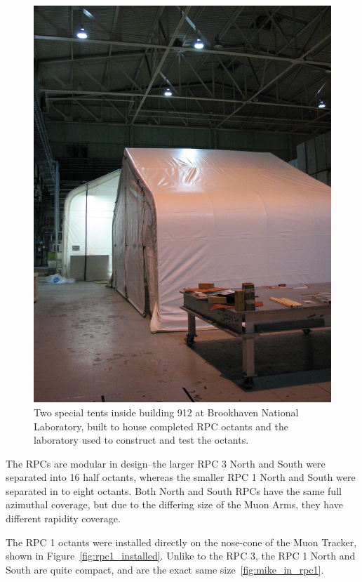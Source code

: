 \begin{figure}
  \centering
  \includegraphics[width=0.5\linewidth]{./figures/building_912_rpc_tent.jpg}
  \caption{
    Two special tents inside building 912 at Brookhaven National Laboratory,
    built to house completed RPC octants and the laboratory used to construct
    and test the octants. 
  }
  \label{fig:building_912}
\end{figure}

The RPCs are modular in design--the larger RPC 3 North and South were separated
into 16 half octants, whereas the smaller RPC 1 North and South were separated
in to eight octants. Both North and South RPCs have the same full azimuthal
coverage, but due to the differing size of the Muon Arms, they have different
rapidity coverage.

The RPC 1 octants were installed directly on the nose-cone of the Muon Tracker,
shown in Figure~\ref{fig:rpc1_installed}. Unlike to the RPC 3, the RPC 1 North
and South are quite compact, and are the exact same size~\ref{fig:mike_in_rpc1}.


